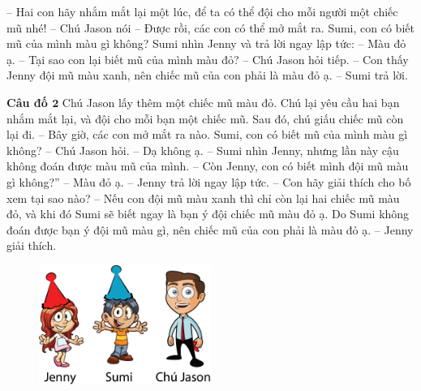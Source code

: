 \begin{adjustwidth}{130pt}{0pt}
	-- Hai con hãy nhắm mắt lại một lúc, để ta có thể đội cho mỗi người một chiếc mũ nhé! -- Chú Jason nói
	-- Được rồi, các con có thể mở mắt ra. Sumi, con có biết mũ của mình màu gì không?
	\vskip 0.1cm
	Sumi nhìn Jenny và trả lời ngay lập tức:
	\vskip 0.1cm
	-- Màu đỏ ạ.
	\vskip 0.1cm
	-- Tại sao con lại biết mũ của mình màu đỏ? -- Chú Jason hỏi tiếp.
	\vskip 0.1cm
	-- Con thấy Jenny đội mũ màu xanh, nên chiếc mũ của con phải là màu đỏ ạ. -- Sumi trả lời.
\end{adjustwidth}
\newpage
	\textbf{\color{toancuabi}Câu đố $\pmb2$}
	\vskip 0.1cm
	Chú Jason lấy thêm một chiếc mũ màu đỏ. Chú lại yêu cầu hai bạn nhắm mắt lại, và đội cho mỗi bạn một chiếc mũ. Sau đó, chú giấu chiếc mũ còn lại đi.
	\vskip 0.1cm
	-- Bây giờ, các con mở mắt ra nào. Sumi, con có biết mũ của mình màu gì không? -- Chú  Jason hỏi.
	\vskip 0.1cm
	-- Dạ không ạ. -- Sumi nhìn Jenny, nhưng lần này cậu không đoán được màu mũ của mình.
	\vskip 0.1cm
	-- Còn Jenny, con có biết mình đội mũ màu  gì không?”
	\vskip 0.1cm
	-- Màu đỏ ạ. -- Jenny trả lời ngay lập tức.
	\vskip 0.1cm
	-- Con hãy giải thích cho bố xem tại sao nào?
	\vskip 0.1cm
	-- Nếu con đội mũ màu xanh thì chỉ còn lại hai chiếc mũ màu đỏ, và khi đó Sumi sẽ biết ngay là bạn ý đội chiếc mũ màu đỏ ạ. Do Sumi không đoán được bạn ý đội mũ màu gì, nên chiếc mũ của con phải là màu đỏ ạ. – Jenny giải thích.
		\begin{figure}[H]
		\centering
		\vspace*{-5pt}
		\captionsetup{labelformat= empty, justification=centering}
		\includegraphics[width=0.5\textwidth]{h2}
		\vspace*{-10pt}
		\end{figure}
